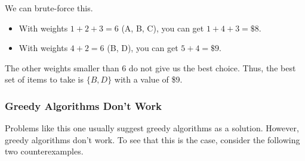 \documentclass[letterpaper]{article}
\begin{document}
\begin{mdframed}[]
    We can brute-force this. 
    \begin{itemize}
        \item With weights $1 + 2 + 3 = 6$ (A, B, C), you can get $1 + 4 + 3 = \$8$. 
        \item With weights $4 + 2 = 6$ (B, D), you can get $5 + 4 = \$9$. 
    \end{itemize}
    The other weights smaller than 6 do not give us the best choice. Thus, the best set of items to take is $\{B, D\}$ with a value of \$9. 
\end{mdframed}


\subsubsection{Greedy Algorithms Don't Work}
Problems like this one usually suggest greedy algorithms as a solution. However, greedy algorithms don't work. To see that this is the case, consider the following two counterexamples.
\end{document}
